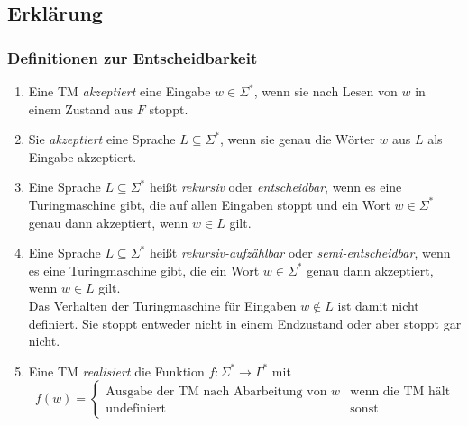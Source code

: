 \subsection{Erklärung}
\begin{frame}
	\frametitle{Definitionen zur Entscheidbarkeit}
	 \begin{enumerate}
  \item Eine TM \emph{akzeptiert} eine Eingabe $w \in \Sigma^*$, wenn sie nach Lesen von $w$ in einem Zustand aus $F$ stoppt.
  \item Sie \emph{akzeptiert} eine Sprache $L \subseteq \Sigma^*$, wenn sie genau die Wörter $w$ aus $L$ als Eingabe akzeptiert.
  \item Eine Sprache $L \subseteq \Sigma^*$ heißt \emph{rekursiv} oder \emph{entscheidbar}, wenn es eine Turingmaschine gibt, die auf allen Eingaben stoppt und
	ein Wort $w \in \Sigma^*$ genau dann akzeptiert, wenn $w \in L$ gilt.
\end{enumerate}
\end{frame}
\begin{frame}
 \begin{enumerate}
 \setcounter{enumi}{3}
  \item Eine Sprache $L \subseteq \Sigma^*$ heißt \emph{rekursiv-aufzählbar} oder \emph{semi-entscheidbar}, wenn es eine Turingmaschine gibt, die ein Wort $w \in \Sigma^*$ genau dann akzeptiert, wenn $w \in L$ gilt. \\ Das Verhalten der Turingmaschine für Eingaben $w \not\in L$ ist damit nicht definiert.
	Sie stoppt entweder nicht in einem Endzustand oder aber stoppt gar nicht.
	\item Eine TM \emph{realisiert} die Funktion $f: \Sigma^* \rightarrow \Gamma^*$ mit $$f(w) = \begin{cases} \text{Ausgabe der TM nach Abarbeitung von } w & \text{wenn die TM hält} \\ \text{undefiniert} & \text{sonst} \end{cases}$$
 \end{enumerate}
\end{frame}
